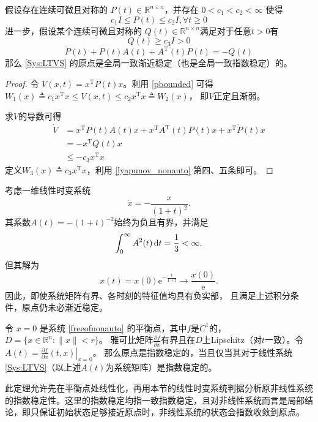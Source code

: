 \begin{corollary}
  假设存在连续可微且对称的 $P (t) \in \mathbb{R}^{n \times n}$，并存在 $0 < c_1 < c_2 < \infty$
  使得
  \begin{equation}\label{pbounded}
    c_1 I \leq P (t) \leq c_2 I, \forall t \geq 0
  \end{equation}
  进一步，假设某个连续可微且对称的 $Q (t) \in \mathbb{R}^{n \times n}$满足对于任意$t>0$有
  \[ Q (t) \geq c_3 I > 0 \]
  \[ \dot{P} (t) + P (t) A (t) + A^\mathrm{T} (t) P (t) = - Q (t) \]
  那么 \eqref{Sys:LTVS} 的原点是全局一致渐近稳定（也是全局一致指数稳定）的。
\end{corollary}
\begin{proof}
    令 $V (x, t) = x^\mathrm{T} P (t) x$。利用 \eqref{pbounded} 可得
  $W_1 (x) \triangleq c_1 x^\mathrm{T} x \leq V (x, t) \leq c_2 x^\mathrm{T} x \triangleq W_2 (x)$，
  即$V$正定且渐弱。
  
  求$V$的导数可得
  \begin{align*}
    \dot{V} & =  x^\mathrm{T} P (t) A (t) x + x^\mathrm{T} A^\mathrm{T} (t) P (t) x + x^\mathrm{T} \dot{P} (t) x\\
    & =  - x^\mathrm{T} Q (t) x\\
    & \leq  - c_3 x^\mathrm{T} x
  \end{align*}
  定义$W_3 (x)\triangleq c_3 x^\mathrm{T} x $，利用 \ref{lyapunov_nonauto} 第四、五条即可。
\end{proof}

\begin{example}[平方可积条件不足以保证渐近稳定]
  考虑一维线性时变系统
  \[
    \dot{x}=-\frac{x}{(1+t)^2}.
  \]
  其系数$A(t)=-(1+t)^{-2}$始终为负且有界，并满足
  \[
    \int_0^\infty A^2(t)\mathop{}\!\mathrm{d} t=\frac13<\infty.
  \]
  但其解为
  \[
    x(t)=x(0)\mathrm{e}^{-\frac{t}{1+t}}
    \longrightarrow \frac{x(0)}{\mathrm{e}}.
  \]
  因此，即使系统矩阵有界、各时刻的特征值均具有负实部，
  且满足上述积分条件，原点仍未必渐近稳定。
\end{example}
\begin{theorem}[利用线性化判别非自治系统的稳定性]
    令 $x = 0$ 是系统 \eqref{freeofnonauto} 的平衡点，其中$f$是$C^1$的，$D=\{x\in \mathbb{R}^n:\|x\|<r\}$。
    雅可比矩阵$\frac{\partial f}{\partial x}$有界且在$D$上Lipschitz（对$t$一致）。令$A(t)=\left.\frac{\partial f}{\partial x}(t,x)\right|_{x=0}$。
    那么原点是指数稳定的，当且仅当其对于线性系统 \eqref{Sys:LTVS}（以上述$A(t)$为系统矩阵）是指数稳定的。
\end{theorem}
\begin{note}
  此定理允许先在平衡点处线性化，再用本节的线性时变系统判据分析原非线性系统的指数稳定性。这里的指数稳定均指一致指数稳定，且对非线性系统而言是局部结论，即只保证初始状态足够接近原点时，非线性系统的状态会指数收敛到原点。
\end{note}
